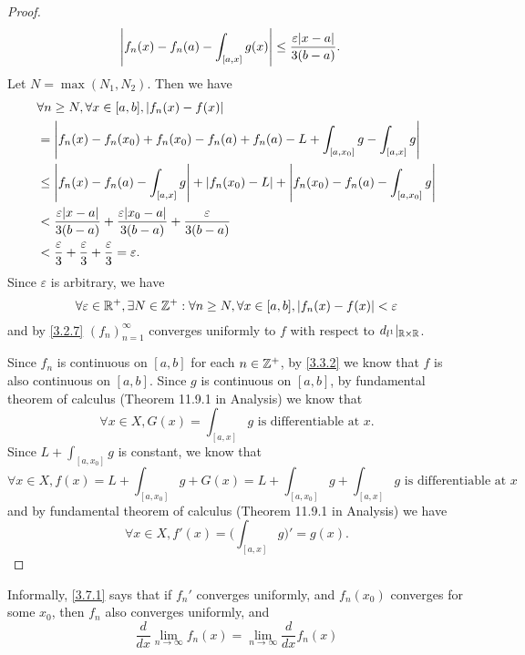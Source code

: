 \begin{proof}
\begin{align*}
             & \abs{f_n(x) - f_n(a) - \int_{[a, x]} g(x)} \leq \dfrac{\varepsilon \abs{x - a}}{3(b - a)}.
  \end{align*}
  Let \(N = \max(N_1, N_2)\).
  Then we have
  \begin{align*}
     & \forall n \geq N, \forall x \in [a, b], \abs{f_n(x) - f(x)}                                                               \\
     & = \abs{f_n(x) - f_n(x_0) + f_n(x_0) - f_n(a) + f_n(a) - L + \int_{[a, x_0]} g - \int_{[a, x]} g}                          \\
     & \leq \abs{f_n(x) - f_n(a) - \int_{[a, x]} g} + \abs{f_n(x_0) - L} + \abs{f_n(x_0) - f_n(a) - \int_{[a, x_0]} g}           \\
     & < \dfrac{\varepsilon \abs{x - a}}{3(b - a)} + \dfrac{\varepsilon \abs{x_0 - a}}{3(b - a)} + \dfrac{\varepsilon}{3(b - a)} \\
     & < \dfrac{\varepsilon}{3} + \dfrac{\varepsilon}{3} + \dfrac{\varepsilon}{3} = \varepsilon.
  \end{align*}
  Since \(\varepsilon\) is arbitrary, we have
  \[
    \forall \varepsilon \in \mathbb{R}^+, \exists N \in \mathbb{Z}^+ : \forall n \geq N, \forall x \in [a, b], \left\lvert f_n(x) - f(x)\right\rvert < \varepsilon
  \]
  and by \cref{3.2.7} \((f_n)_{n = 1}^\infty\) converges uniformly to \(f\) with respect to \(d_{l^1}|_{\mathbb{R} \times \mathbb{R}}\).

  Since \(f_n\) is continuous on \([a, b]\) for each \(n \in \mathbb{Z}^+\), by \cref{3.3.2} we know that \(f\) is also continuous on \([a, b]\).
  Since \(g\) is continuous on \([a, b]\), by fundamental theorem of calculus (Theorem 11.9.1 in Analysis) we know that
  \[
    \forall x \in X, G(x) = \int_{[a, x]} g \text{ is differentiable at } x.
  \]
  Since \(L + \int_{[a, x_0]} g\) is constant, we know that
  \[
    \forall x \in X, f(x) = L + \int_{[a, x_0]} g + G(x) = L + \int_{[a, x_0]} g + \int_{[a, x]} g \text{ is differentiable at } x
  \]
  and by fundamental theorem of calculus (Theorem 11.9.1 in Analysis) we have
  \[
    \forall x \in X, f'(x) = \bigg(\int_{[a, x]} g\bigg)' = g(x).
  \]
\end{proof}

\begin{note}
  Informally, \cref{3.7.1} says that if \(f_n'\) converges uniformly, and \(f_n(x_0)\) converges for some \(x_0\), then \(f_n\) also converges uniformly, and
  \[
    \dfrac{d}{dx} \lim_{n \to \infty} f_n(x) = \lim_{n \to \infty} \dfrac{d}{dx} f_n(x)
  \]
\end{note}

